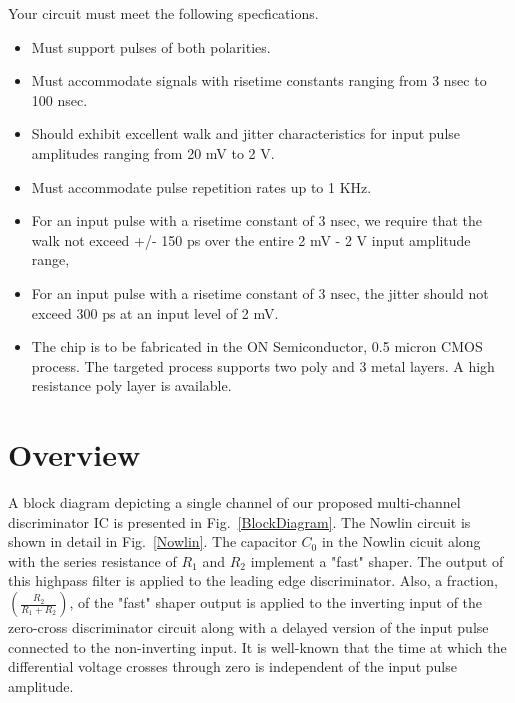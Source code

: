 \documentclass[12pt, onecolumn]{IEEEtran}
\begin{document}
Your circuit must meet the following specfications.
\begin{itemize}
\item
Must support pulses of both polarities.
\item
Must accommodate signals with risetime constants ranging from 3 nsec to 100 nsec.
\item
Should exhibit excellent walk and jitter characteristics for input pulse amplitudes ranging from 20 mV to 2 V. 
\item
Must accommodate pulse repetition rates up to 1 KHz.
\item
For an input pulse with a risetime constant of 3 nsec, we require that the walk not exceed +/- 150 ps over the entire 2 mV - 2 V input amplitude range,
\item
For an input pulse with a risetime constant of 3 nsec, the jitter should not exceed 300 ps at an input level of 2 mV.
\item
The chip is to be fabricated in the ON Semiconductor, 0.5 micron CMOS process.  The targeted process supports two poly and 3 metal layers.  A high resistance poly layer is available.
\end{itemize} 
 
\section*{Overview}

\noindent
\newline
A block diagram depicting a single channel of our proposed multi-channel discriminator IC is presented in Fig.~\ref{BlockDiagram}. The Nowlin circuit is shown in detail in Fig.~\ref{Nowlin}.  The capacitor $C_0$ in the Nowlin cicuit along with the series resistance of $R_1$ and $R_2$ implement a "fast" shaper.  The output of this highpass filter is applied to the leading edge discriminator. Also, a fraction, $(\frac{R_2}{R_1 + R_2})$, of the "fast" shaper output is applied to the inverting input of the zero-cross discriminator circuit along with a delayed version of the input pulse connected to the non-inverting input. It is well-known that the time at which the differential voltage crosses through zero is independent of the input pulse amplitude.\\
\end{document}
